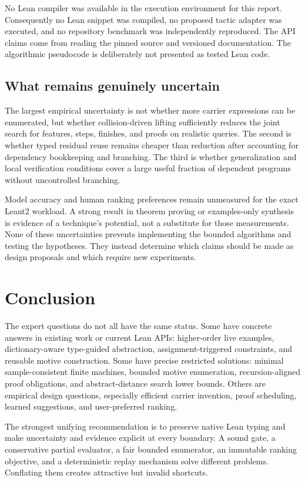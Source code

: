\documentclass[11pt,a4paper]{article}
\theoremstyle{remark}
\begin{document}
No Lean compiler was available in the execution environment for this report.
Consequently no Lean snippet was compiled, no proposed tactic adapter was
executed, and no repository benchmark was independently reproduced. The API
claims come from reading the pinned source and versioned documentation.
The algorithmic pseudocode is deliberately not presented as tested Lean code.

\subsection{What remains genuinely uncertain}

The largest empirical uncertainty is not whether more carrier expressions
can be enumerated, but whether collision-driven lifting sufficiently reduces
the joint search for features, steps, finishes, and proofs on realistic
queries. The second is whether typed residual reuse remains cheaper than
reduction after accounting for dependency bookkeeping and branching. The
third is whether generalization and local verification conditions cover a
large useful fraction of dependent programs without uncontrolled branching.

Model accuracy and human ranking preferences remain unmeasured for the exact
Leant2 workload. A strong result in theorem proving or examples-only synthesis
is evidence of a technique's potential, not a substitute for those
measurements. None of these uncertainties prevents implementing the bounded
algorithms and testing the hypotheses. They instead determine which claims
should be made as design proposals and which require new experiments.

\section{Conclusion}

The expert questions do not all have the same status. Some have concrete
answers in existing work or current Lean APIs: higher-order live examples,
dictionary-aware type-guided abstraction, assignment-triggered constraints,
and reusable motive construction. Some have precise restricted solutions:
minimal sample-consistent finite machines, bounded motive enumeration,
recursion-aligned proof obligations, and abstract-distance search lower
bounds. Others are empirical design questions, especially efficient carrier
invention, proof scheduling, learned suggestions, and user-preferred ranking.

The strongest unifying recommendation is to preserve native Lean typing and
make uncertainty and evidence explicit at every boundary. A sound gate,
a conservative partial evaluator, a fair bounded enumerator, an immutable
ranking objective, and a deterministic replay mechanism solve different
problems. Conflating them creates attractive but invalid shortcuts.
\end{document}
